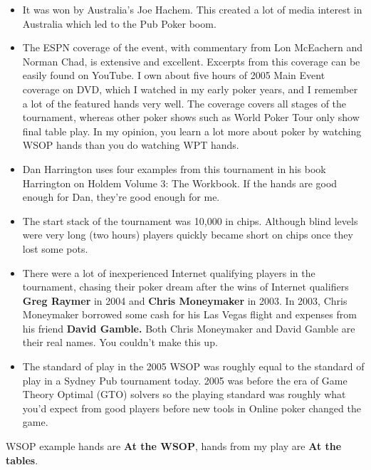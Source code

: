 \begin{itemize}
  \item It was won by Australia's Joe Hachem. This created a lot of
    media interest in Australia which led to the Pub Poker boom.
  \item The ESPN coverage of the event, with commentary from
    Lon McEachern and Norman Chad, is extensive and
    excellent. Excerpts from this coverage can be easily found on
    YouTube. I own about five hours of 2005 Main Event coverage on
    DVD, which I watched in my early poker years, and I remember a lot
    of the featured hands very well. The coverage covers all stages of
    the tournament, whereas other poker shows such as World Poker Tour
    only show final table play. In my opinion, you learn a lot more
    about poker by watching WSOP hands than you do watching WPT hands.
  \item Dan Harrington uses four examples from this tournament in his
    book Harrington on Holdem Volume 3: The Workbook. If the hands are
    good enough for Dan, they're good enough for me.
  \item The start stack of the tournament was 10,000 in
    chips. Although blind levels were very long (two hours)
    players quickly became short on chips once they lost some pots.
  \item There were a lot of inexperienced Internet qualifying players
    in the tournament, chasing their poker dream after the wins of
    Internet qualifiers \textbf{Greg Raymer} in 2004 and \textbf{Chris
    Moneymaker} in 2003. In 2003, Chris Moneymaker
    borrowed some cash for his Las Vegas flight and expenses from his
    friend \textbf{David Gamble.} Both Chris Moneymaker and David Gamble are
    their real names. You couldn't make this up.
  \item The standard of play in the 2005 WSOP was roughly equal to the
    standard of play in a Sydney Pub tournament today. 2005 was before
    the era of Game Theory Optimal (GTO) solvers so the playing
    standard was roughly what you'd expect from good players before
    new tools in Online poker changed the game.

\end{itemize}

WSOP example hands are \textbf{At the WSOP}, hands from my play are
\textbf{At the tables}.


